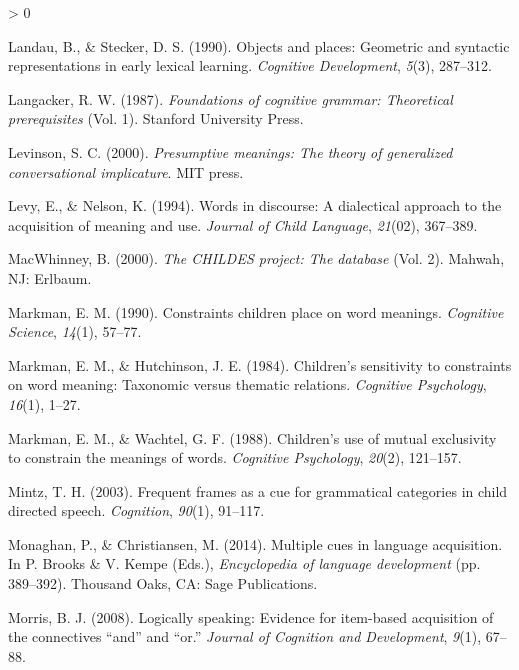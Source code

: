 \documentclass[
  english,
  ,man,floatsintext]{apa6}
\newlength{\cslhangindent}
\newenvironment{CSLReferences}[2] %
 {%
  \setlength{\parindent}{0pt}
  \ifodd #1 \everypar{\setlength{\hangindent}{\cslhangindent}}\ignorespaces\fi
  \ifnum #2 > 0
  \setlength{\parskip}{#2\baselineskip}
  \fi
 }%
 {}
\begin{document}
\begin{CSLReferences}{1}{0}
\leavevmode\hypertarget{ref-landau1990objects}{}%
Landau, B., \& Stecker, D. S. (1990). Objects and places: Geometric and syntactic representations in early lexical learning. \emph{Cognitive Development}, \emph{5}(3), 287--312.

\leavevmode\hypertarget{ref-langacker1987foundations}{}%
Langacker, R. W. (1987). \emph{Foundations of cognitive grammar: Theoretical prerequisites} (Vol. 1). {S}tanford {U}niversity {P}ress.

\leavevmode\hypertarget{ref-levinson2000presumptive}{}%
Levinson, S. C. (2000). \emph{Presumptive meanings: The theory of generalized conversational implicature}. MIT press.

\leavevmode\hypertarget{ref-levy1994words}{}%
Levy, E., \& Nelson, K. (1994). Words in discourse: A dialectical approach to the acquisition of meaning and use. \emph{Journal of Child Language}, \emph{21}(02), 367--389.

\leavevmode\hypertarget{ref-macwhinney2000childes}{}%
MacWhinney, B. (2000). \emph{The {CHILDES} project: The database} (Vol. 2). Mahwah, NJ: Erlbaum.

\leavevmode\hypertarget{ref-markman1990constraints}{}%
Markman, E. M. (1990). Constraints children place on word meanings. \emph{Cognitive Science}, \emph{14}(1), 57--77.

\leavevmode\hypertarget{ref-markman1984children}{}%
Markman, E. M., \& Hutchinson, J. E. (1984). Children's sensitivity to constraints on word meaning: Taxonomic versus thematic relations. \emph{Cognitive Psychology}, \emph{16}(1), 1--27.

\leavevmode\hypertarget{ref-markman1988children}{}%
Markman, E. M., \& Wachtel, G. F. (1988). Children's use of mutual exclusivity to constrain the meanings of words. \emph{Cognitive Psychology}, \emph{20}(2), 121--157.

\leavevmode\hypertarget{ref-mintz2003frequent}{}%
Mintz, T. H. (2003). Frequent frames as a cue for grammatical categories in child directed speech. \emph{Cognition}, \emph{90}(1), 91--117.

\leavevmode\hypertarget{ref-monaghan2014multiple}{}%
Monaghan, P., \& Christiansen, M. (2014). Multiple cues in language acquisition. In P. Brooks \& V. Kempe (Eds.), \emph{Encyclopedia of language development} (pp. 389--392). Thousand Oaks, CA: Sage Publications.

\leavevmode\hypertarget{ref-morris2008logically}{}%
Morris, B. J. (2008). Logically speaking: Evidence for item-based acquisition of the connectives {``and''} and {``or.''} \emph{Journal of Cognition and Development}, \emph{9}(1), 67--88.


\end{CSLReferences}
\end{document}
